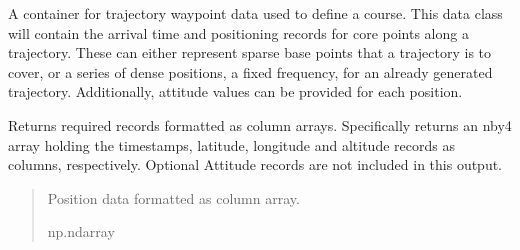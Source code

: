 \documentclass[letterpaper,10pt,english]{sphinxmanual}
\begin{document}

\begin{fulllineitems}
\label{\detokenize{modules/waypoints/trajectory:qnav.waypoints.trajectory.Waypoints}}
\pysigstartsignatures
{}
\pysigstopsignatures
\sphinxAtStartPar
A container for trajectory waypoint data used to define a course.
This data class will contain the arrival time and positioning records
for core points along a trajectory. These can either represent sparse
base points that a trajectory is to cover, or a series of dense
positions, a fixed frequency, for an already generated trajectory.
Additionally, attitude values can be provided for each position.

\begin{fulllineitems}
\label{\detokenize{modules/waypoints/trajectory:qnav.waypoints.trajectory.Waypoints.as_array}}
\pysigstartsignatures
{}
\pysigstopsignatures
\sphinxAtStartPar
Returns required records formatted as column arrays.
Specifically returns an n\sphinxhyphen{}by\sphinxhyphen{}4 array holding the timestamps, latitude,
longitude and altitude records as columns, respectively. Optional
Attitude records are not included in this output.
\begin{quote}\begin{description}
\sphinxAtStartPar
Position data formatted as column array.

\sphinxAtStartPar
np.ndarray

\end{description}\end{quote}

\end{fulllineitems}


\end{fulllineitems}
\end{document}
